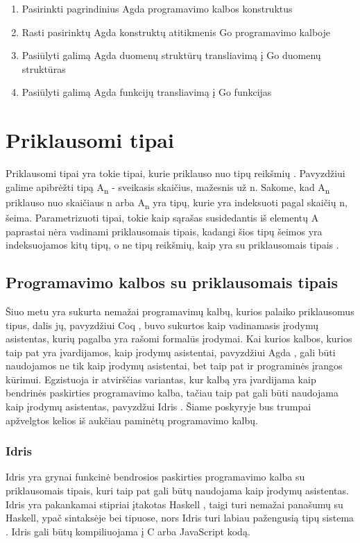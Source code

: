 \documentclass{VUMIFPSkursinis}
\begin{document}
\begin{enumerate}[noitemsep]
  \item Pasirinkti pagrindinius Agda programavimo kalbos konstruktus
  \item Rasti pasirinktų Agda konstruktų atitikmenis Go programavimo kalboje
  \item Pasiūlyti galimą Agda duomenų struktūrų transliavimą į Go duomenų struktūras
  \item Pasiūlyti galimą Agda funkcijų transliavimą į Go funkcijas
\end{enumerate}
\section{Priklausomi tipai}
Priklausomi tipai yra tokie tipai, kurie priklauso nuo tipų reikšmių \cite{depentantTypesAtWork}. Pavyzdžiui galime apibrėžti tipą A\textsubscript{n} - sveikasis skaičius, mažesnis už n. Sakome, kad A\textsubscript{n} priklauso nuo skaičiaus n arba A\textsubscript{n} yra tipų, kurie yra indeksuoti pagal skaičių n, šeima. Parametrizuoti tipai, tokie kaip sąrašas susidedantis iš elementų A paprastai nėra vadinami priklausomais tipais, kadangi šios tipų šeimos yra indeksuojamos kitų tipų, o ne tipų reikšmių, kaip yra su priklausomais tipais \cite{depentantTypesAtWork}.
\subsection{Programavimo kalbos su priklausomais tipais}
Šiuo metu yra sukurta nemažai programavimų kalbų, kurios palaiko priklausomus tipus, dalis jų, pavyzdžiui Coq \cite{coq}, buvo sukurtos kaip vadinamasis įrodymų asistentas, kurių pagalba yra rašomi formalūs įrodymai. Kai kurios kalbos, kurios taip pat yra įvardijamos, kaip įrodymų asistentai, pavyzdžiui Agda \cite{agda_book}, gali būti naudojamos ne tik kaip įrodymų asistentai, bet taip pat ir programinės įrangos kūrimui. Egzistuoja ir atvirščias variantas, kur kalbą yra įvardijama kaip bendrinės paskirties programavimo kalba, tačiau taip pat gali būti naudojama kaip įrodymų asistentas, pavyzdžui Idris \cite{idris}. Šiame poskyryje bus trumpai apžvelgtos kelios iš aukčiau paminėtų programavimo kalbų.
\subsubsection{Idris}
Idris yra grynai funkcinė bendrosios paskirties programavimo kalba su priklausomais tipais, kuri taip pat gali būtų naudojama kaip įrodymų asistentas. Idris yra pakankamai stipriai įtakotas Haskell \cite{haskell}, taigi turi nemažai panašumų su Haskell, ypač sintaksėje bei tipuose, nors Idris turi labiau pažengusią tipų sistema \cite{idris}. Idris gali būtų kompiliuojama į C arba JavaScript kodą.
\end{document}
